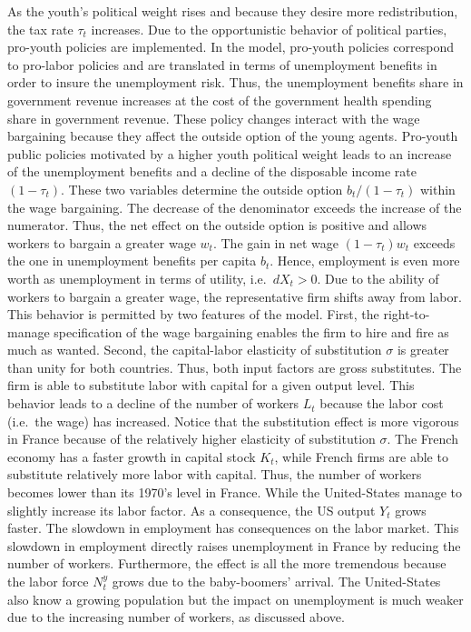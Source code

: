 \documentclass[
]{article}
\begin{document}
As the youth's political weight rises and because they desire more redistribution, the tax rate \(\tau_t\) increases. Due to the opportunistic behavior of political parties, pro-youth policies are implemented. In the model, pro-youth policies correspond to pro-labor policies and are translated in terms of unemployment benefits in order to insure the unemployment risk. Thus, the unemployment benefits share in government revenue increases at the cost of the government health spending share in government revenue. These policy changes interact with the wage bargaining because they affect the outside option of the young agents. Pro-youth public policies motivated by a higher youth political weight leads to an increase of the unemployment benefits and a decline of the disposable income rate \((1-\tau_t)\). These two variables determine the outside option \(b_t/(1-\tau_t)\) within the wage bargaining. The decrease of the denominator exceeds the increase of the numerator. Thus, the net effect on the outside option is positive and allows workers to bargain a greater wage \(w_t\). The gain in net wage \((1-\tau_t)w_t\) exceeds the one in unemployment benefits per capita \(b_t\). Hence, employment is even more worth as unemployment in terms of utility, i.e.~\(dX_t > 0\). Due to the ability of workers to bargain a greater wage, the representative firm shifts away from labor. This behavior is permitted by two features of the model. First, the right-to-manage specification of the wage bargaining enables the firm to hire and fire as much as wanted. Second, the capital-labor elasticity of substitution \(\sigma\) is greater than unity for both countries. Thus, both input factors are gross substitutes. The firm is able to substitute labor with capital for a given output level. This behavior leads to a decline of the number of workers \(L_t\) because the labor cost (i.e.~the wage) has increased. Notice that the substitution effect is more vigorous in France because of the relatively higher elasticity of substitution \(\sigma\). The French economy has a faster growth in capital stock \(K_t\), while French firms are able to substitute relatively more labor with capital. Thus, the number of workers becomes lower than its 1970's level in France. While the United-States manage to slightly increase its labor factor. As a consequence, the US output \(Y_t\) grows faster.
The slowdown in employment has consequences on the labor market.
This slowdown in employment directly raises unemployment in France by reducing the number of workers. Furthermore, the effect is all the more tremendous because the labor force \(N_t^y\) grows due to the baby-boomers' arrival. The United-States also know a growing population but the impact on unemployment is much weaker due to the increasing number of workers, as discussed above.
\end{document}
